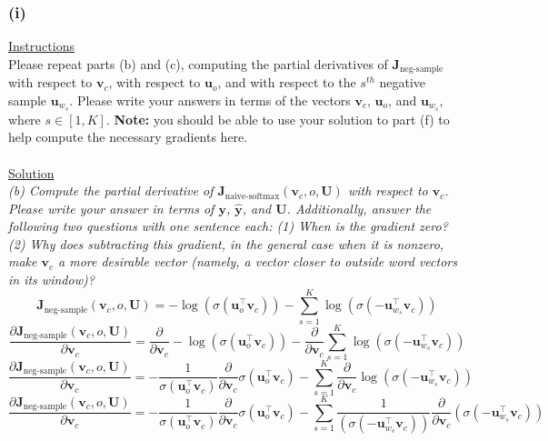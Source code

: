 \documentclass[12pt]{article}
\begin{document}
\subsubsection{(i)}
\underline{Instructions}
~\\
Please repeat parts (b) and (c), computing the partial derivatives of $\bm J_{\text{neg-sample}}$ 
with respect to $\bm v_c$, with respect to $\bm u_o$, and with respect to the $s^{th}$ negative sample 
$\bm u_{w_s}$. Please write your answers in terms of the vectors $\bm v_c$, $\bm u_o$, and $\bm u_{w_s}$, 
where $s \in [1, K]$. \textbf{Note:} you should be able to use your solution to part (f) to help compute the necessary gradients here.
~\\
~\\
\underline{Solution}
~\\
\emph{(b) Compute the partial derivative of $\bm J_{\text{naive-softmax}}(\bm v_c, o, \bm U)$ with respect to $\bm v_c$. 
Please write your answer in terms of $\bm y$, $\hat{\bm y}$, and $\bm U$. Additionally, answer the following 
two questions with one sentence each: (1) When is the gradient zero? (2) Why does subtracting this gradient, 
in the general case when it is nonzero, make $\bm v_c$ a more desirable vector (namely, a vector closer to 
outside word vectors in its window)?}
\begin{equation*}
    \bm J_{\text{neg-sample}}(\bm v_c, o, \bm U) = -\log(\sigma(\bm u_o^\top \bm v_c)) - \sum_{s=1}^K \log(\sigma(-\bm u_{w_s}^\top \bm v_c))
\end{equation*}
\begin{equation*}
    \frac{\partial \bm J_{\text{neg-sample}}(\bm v_c, o, \bm U)}{\partial \bm v_c} = 
    \frac{\partial}{\partial \bm v_c}
    -\log(\sigma(\bm u_o^\top \bm v_c)) - 
    \frac{\partial}{\partial \bm v_c}
    \sum_{s=1}^K \log(\sigma(-\bm u_{w_s}^\top \bm v_c))
\end{equation*}
\begin{equation*}
    \frac{\partial \bm J_{\text{neg-sample}}(\bm v_c, o, \bm U)}{\partial \bm v_c} = 
    - \frac{1}{\sigma(\bm u_o^\top \bm v_c)} 
    \frac{\partial}{\partial \bm v_c}
    \sigma(\bm u_o^\top \bm v_c) - 
    \sum_{s=1}^K 
    \frac{\partial}{\partial \bm v_c}
    \log(\sigma(-\bm u_{w_s}^\top \bm v_c))
\end{equation*}\begin{equation*}
    \frac{\partial \bm J_{\text{neg-sample}}(\bm v_c, o, \bm U)}{\partial \bm v_c} = 
    - \frac{1}{\sigma(\bm u_o^\top \bm v_c)} 
    \frac{\partial}{\partial \bm v_c}
    \sigma(\bm u_o^\top \bm v_c) - 
    \sum_{s=1}^K \frac{1}{(\sigma(-\bm u_{w_s}^\top \bm v_c))}
    \frac{\partial}{\partial \bm v_c}
    (\sigma(-\bm u_{w_s}^\top \bm v_c))
\end{equation*}
\end{document}
